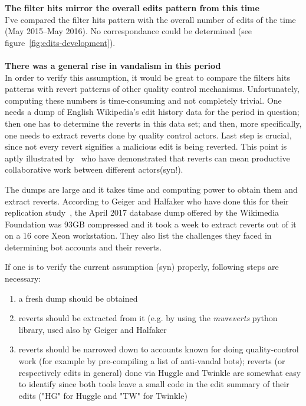 \textbf{The filter hits mirror the overall edits pattern from this time} \\
I've compared the filter hits pattern with the overall number of edits of the time (May 2015–May 2016).
No correspondance could be determined (see figure~\ref{fig:edits-development}).
\\
\\
\textbf{There was a general rise in vandalism in this period}\\
In order to verify this assumption, it would be great to compare the filters hits patterns with revert patterns of other quality control mechanisms.
Unfortunately, computing these numbers is time-consuming and not completely trivial.
One needs a dump of English Wikipedia's edit history data for the period in question;
then one has to determine the reverts in this data set;
and then, more specifically, one needs to extract reverts done by quality control actors.
Last step is crucial, since not every revert signifies a malicious edit is being reverted.
This point is aptly illustrated by~\cite{GeiHal2017} who have demonstrated that reverts can mean productive collaborative work between different actors(syn!).

The dumps are large and it takes time and computing power to obtain them and extract reverts.
According to Geiger and Halfaker who have done this for their replication study~\cite{GeiHal2017}, the April 2017 database dump offered by the Wikimedia Foundation was 93GB compressed and it took a week to extract reverts out of it on a 16 core Xeon workstation.
They also list the challenges they faced in determining bot accounts and their reverts.

If one is to verify the current assumption (syn) properly, following steps are necessary:
\begin{enumerate}
    \item a fresh dump should be obtained
    \item reverts should be extracted from it (e.g. by using the \emph{mwreverts} python library, used also by Geiger and Halfaker
    \item reverts should be narrowed down to accounts known for doing quality-control work (for example by pre-compiling a list of anti-vandal bots); reverts (or respectively edits in general) done via Huggle and Twinkle are somewhat easy to identify since both tools leave a small code in the edit summary of their edits ("HG" for Huggle and "TW" for Twinkle)%
\end{enumerate}

